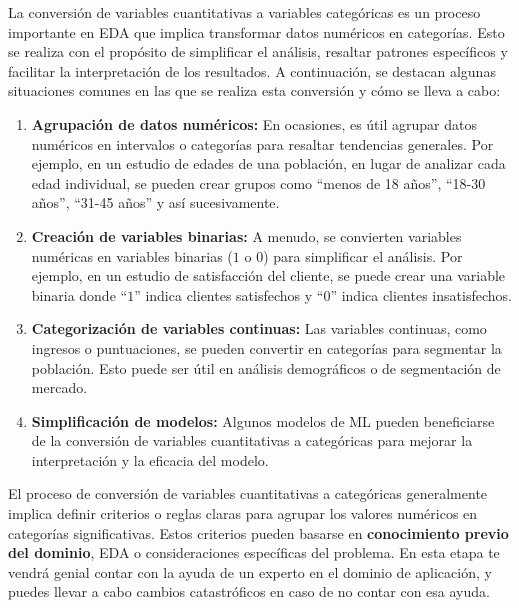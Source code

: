 \documentclass[
  letterpaper,
  DIV=11,
  numbers=noendperiod]{scrreprt}
\begin{document}
La conversión de variables cuantitativas a variables categóricas es un
proceso importante en EDA que implica transformar datos numéricos en
categorías. Esto se realiza con el propósito de simplificar el análisis,
resaltar patrones específicos y facilitar la interpretación de los
resultados. A continuación, se destacan algunas situaciones comunes en
las que se realiza esta conversión y cómo se lleva a cabo:

\begin{enumerate}
\def\labelenumi{\arabic{enumi}.}
\item
  \textbf{Agrupación de datos numéricos:} En ocasiones, es útil agrupar
  datos numéricos en intervalos o categorías para resaltar tendencias
  generales. Por ejemplo, en un estudio de edades de una población, en
  lugar de analizar cada edad individual, se pueden crear grupos como
  ``menos de 18 años'', ``18-30 años'', ``31-45 años'' y así
  sucesivamente.
\item
  \textbf{Creación de variables binarias:} A menudo, se convierten
  variables numéricas en variables binarias (\(1\) o \(0\)) para
  simplificar el análisis. Por ejemplo, en un estudio de satisfacción
  del cliente, se puede crear una variable binaria donde ``\(1\)''
  indica clientes satisfechos y ``\(0\)'' indica clientes insatisfechos.
\item
  \textbf{Categorización de variables continuas:} Las variables
  continuas, como ingresos o puntuaciones, se pueden convertir en
  categorías para segmentar la población. Esto puede ser útil en
  análisis demográficos o de segmentación de mercado.
\item
  \textbf{Simplificación de modelos:} Algunos modelos de ML pueden
  beneficiarse de la conversión de variables cuantitativas a categóricas
  para mejorar la interpretación y la eficacia del modelo.
\end{enumerate}

\begin{tcolorbox}[enhanced jigsaw, arc=.35mm, breakable, coltitle=black, left=2mm, opacityback=0, bottomtitle=1mm, colbacktitle=quarto-callout-important-color!10!white, title=\textcolor{quarto-callout-important-color}{\faExclamation}\hspace{0.5em}{Para recordar}, titlerule=0mm, colback=white, colframe=quarto-callout-important-color-frame, bottomrule=.15mm, rightrule=.15mm, opacitybacktitle=0.6, toptitle=1mm, toprule=.15mm, leftrule=.75mm]

El proceso de conversión de variables cuantitativas a categóricas
generalmente implica definir criterios o reglas claras para agrupar los
valores numéricos en categorías significativas. Estos criterios pueden
basarse en \textbf{conocimiento previo del dominio}, EDA o
consideraciones específicas del problema. En esta etapa te vendrá genial
contar con la ayuda de un experto en el dominio de aplicación, y puedes
llevar a cabo cambios catastróficos en caso de no contar con esa ayuda.

\end{tcolorbox}
\end{document}
